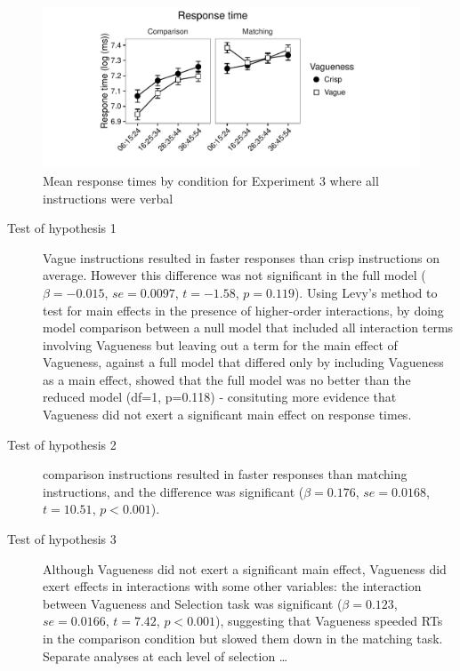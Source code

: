 \begin{figure}[htbp]
\centering
\includegraphics[width=\textwidth]{figures/Ee3-rtplot-1.pdf}
\caption{Mean response times by condition for Experiment 3 where all instructions were verbal}
\label{resultsE-exp-3}
\end{figure}

\begin{description}
	\item [Test of hypothesis 1] Vague instructions resulted in faster responses than crisp instructions on average. However this difference was not significant in the full model ($\beta=-0.015$, $se=0.0097$, $t=-1.58$, $p=0.119$). Using Levy's method \citep{Levy:MainEffectsInteractions} to test for main effects in the presence of higher-order interactions, by doing model comparison between a null model that included all interaction terms involving Vagueness but leaving out a term for the main effect of Vagueness, against a full model that differed only by including Vagueness as a main effect, showed that the full model was no better than the reduced model (df=1, p=0.118) - consituting more evidence that Vagueness did not exert a significant main effect on response times. 
	\item [Test of hypothesis 2] comparison instructions resulted in faster responses than matching instructions, and the difference was significant ($\beta=0.176$, $se=0.0168$, $t=10.51$, $p<0.001$).
	\item [Test of hypothesis 3] Although Vagueness did not exert a significant main effect, Vagueness did exert effects in interactions with some other variables: the interaction between Vagueness and Selection task  was significant ($\beta=0.123$, $se=0.0166$, $t=7.42$, $p<0.001$), suggesting that Vagueness speeded RTs in the comparison condition but slowed them down in the matching task. 
	Separate analyses at each level of selection \ldots
\end{description}

